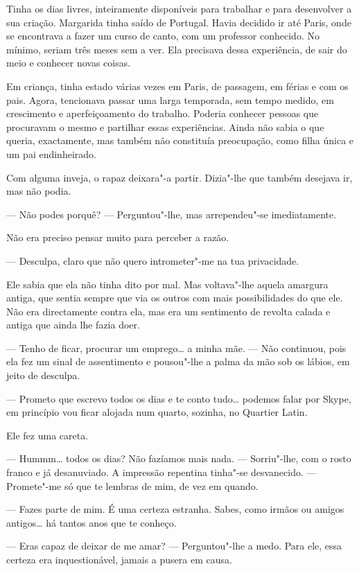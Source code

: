 Tinha os dias livres, inteiramente disponíveis para trabalhar e para
desenvolver a sua criação. Margarida tinha saído de Portugal. Havia
decidido ir até Paris, onde se encontrava a fazer um curso de canto, com
um professor conhecido. No mínimo, seriam três meses sem a ver. Ela
precisava dessa experiência, de sair do meio e conhecer novas coisas.

Em criança, tinha estado várias vezes em Paris, de passagem, em férias e
com os pais. Agora, tencionava passar uma larga temporada, sem tempo
medido, em crescimento e aperfeiçoamento do trabalho. Poderia conhecer
pessoas que procuravam o mesmo e partilhar essas experiências. Ainda não
sabia o que queria, exactamente, mas também não constituía preocupação,
como filha única e um pai endinheirado.

Com alguma inveja, o rapaz deixara"-a partir. Dizia"-lhe que também
desejava ir, mas não podia.

--- Não podes porquê? --- Perguntou"-lhe, mas arrependeu"-se imediatamente.

Não era preciso pensar muito para perceber a razão.

--- Desculpa, claro que não quero intrometer"-me na tua privacidade.

Ele sabia que ela não tinha dito por mal. Mas voltava"-lhe aquela
amargura antiga, que sentia sempre que via os outros com mais
possibilidades do que ele. Não era directamente contra ela, mas era um
sentimento de revolta calada e antiga que ainda lhe fazia doer.

--- Tenho de ficar, procurar um emprego\ldots{} a minha mãe. --- Não continuou,
pois ela fez um sinal de assentimento e pousou"-lhe a palma da mão sob os
lábios, em jeito de desculpa.

--- Prometo que escrevo todos os dias e te conto tudo\ldots{} podemos falar por
Skype, em princípio vou ficar alojada num quarto, sozinha, no Quartier
Latin.

Ele fez uma careta.

--- Hummm\ldots{} todos os dias? Não fazíamos mais nada. --- Sorriu"-lhe, com
o rosto franco e já desanuviado. A impressão repentina tinha"-se
desvanecido. --- Promete"-me só que te lembras de mim, de vez em quando.

--- Fazes parte de mim. É uma certeza estranha. Sabes, como irmãos ou
amigos antigos\ldots{} há tantos anos que te conheço.

--- Eras capaz de deixar de me amar? --- Perguntou"-lhe a medo. Para ele,
essa certeza era inquestionável, jamais a pusera em causa.

